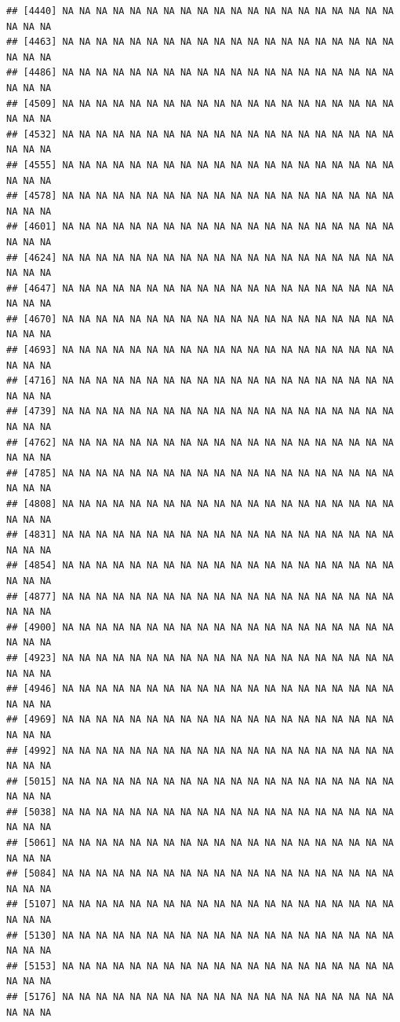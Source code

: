 \documentclass{article}\usepackage[]{graphicx}\usepackage[]{color}
\makeatletter
\newenvironment{kframe}{%
 \def\at@end@of@kframe{}%
 \ifinner\ifhmode%
  \def\at@end@of@kframe{\end{minipage}}%
  \begin{minipage}{\columnwidth}%
 \fi\fi%
 \def\FrameCommand##1{\hskip\@totalleftmargin \hskip-\fboxsep
 \colorbox{shadecolor}{##1}\hskip-\fboxsep
     \hskip-\linewidth \hskip-\@totalleftmargin \hskip\columnwidth}%
 \MakeFramed {\advance\hsize-\width
   \@totalleftmargin\z@ \linewidth\hsize
   \@setminipage}}%
 {\par\unskip\endMakeFramed%
 \at@end@of@kframe}
\newenvironment{knitrout}{}{} %
\makeatother
\begin{document}
\begin{knitrout}
\begin{kframe}
\begin{verbatim}
## [4440] NA NA NA NA NA NA NA NA NA NA NA NA NA NA NA NA NA NA NA NA NA NA NA
## [4463] NA NA NA NA NA NA NA NA NA NA NA NA NA NA NA NA NA NA NA NA NA NA NA
## [4486] NA NA NA NA NA NA NA NA NA NA NA NA NA NA NA NA NA NA NA NA NA NA NA
## [4509] NA NA NA NA NA NA NA NA NA NA NA NA NA NA NA NA NA NA NA NA NA NA NA
## [4532] NA NA NA NA NA NA NA NA NA NA NA NA NA NA NA NA NA NA NA NA NA NA NA
## [4555] NA NA NA NA NA NA NA NA NA NA NA NA NA NA NA NA NA NA NA NA NA NA NA
## [4578] NA NA NA NA NA NA NA NA NA NA NA NA NA NA NA NA NA NA NA NA NA NA NA
## [4601] NA NA NA NA NA NA NA NA NA NA NA NA NA NA NA NA NA NA NA NA NA NA NA
## [4624] NA NA NA NA NA NA NA NA NA NA NA NA NA NA NA NA NA NA NA NA NA NA NA
## [4647] NA NA NA NA NA NA NA NA NA NA NA NA NA NA NA NA NA NA NA NA NA NA NA
## [4670] NA NA NA NA NA NA NA NA NA NA NA NA NA NA NA NA NA NA NA NA NA NA NA
## [4693] NA NA NA NA NA NA NA NA NA NA NA NA NA NA NA NA NA NA NA NA NA NA NA
## [4716] NA NA NA NA NA NA NA NA NA NA NA NA NA NA NA NA NA NA NA NA NA NA NA
## [4739] NA NA NA NA NA NA NA NA NA NA NA NA NA NA NA NA NA NA NA NA NA NA NA
## [4762] NA NA NA NA NA NA NA NA NA NA NA NA NA NA NA NA NA NA NA NA NA NA NA
## [4785] NA NA NA NA NA NA NA NA NA NA NA NA NA NA NA NA NA NA NA NA NA NA NA
## [4808] NA NA NA NA NA NA NA NA NA NA NA NA NA NA NA NA NA NA NA NA NA NA NA
## [4831] NA NA NA NA NA NA NA NA NA NA NA NA NA NA NA NA NA NA NA NA NA NA NA
## [4854] NA NA NA NA NA NA NA NA NA NA NA NA NA NA NA NA NA NA NA NA NA NA NA
## [4877] NA NA NA NA NA NA NA NA NA NA NA NA NA NA NA NA NA NA NA NA NA NA NA
## [4900] NA NA NA NA NA NA NA NA NA NA NA NA NA NA NA NA NA NA NA NA NA NA NA
## [4923] NA NA NA NA NA NA NA NA NA NA NA NA NA NA NA NA NA NA NA NA NA NA NA
## [4946] NA NA NA NA NA NA NA NA NA NA NA NA NA NA NA NA NA NA NA NA NA NA NA
## [4969] NA NA NA NA NA NA NA NA NA NA NA NA NA NA NA NA NA NA NA NA NA NA NA
## [4992] NA NA NA NA NA NA NA NA NA NA NA NA NA NA NA NA NA NA NA NA NA NA NA
## [5015] NA NA NA NA NA NA NA NA NA NA NA NA NA NA NA NA NA NA NA NA NA NA NA
## [5038] NA NA NA NA NA NA NA NA NA NA NA NA NA NA NA NA NA NA NA NA NA NA NA
## [5061] NA NA NA NA NA NA NA NA NA NA NA NA NA NA NA NA NA NA NA NA NA NA NA
## [5084] NA NA NA NA NA NA NA NA NA NA NA NA NA NA NA NA NA NA NA NA NA NA NA
## [5107] NA NA NA NA NA NA NA NA NA NA NA NA NA NA NA NA NA NA NA NA NA NA NA
## [5130] NA NA NA NA NA NA NA NA NA NA NA NA NA NA NA NA NA NA NA NA NA NA NA
## [5153] NA NA NA NA NA NA NA NA NA NA NA NA NA NA NA NA NA NA NA NA NA NA NA
## [5176] NA NA NA NA NA NA NA NA NA NA NA NA NA NA NA NA NA NA NA NA NA NA NA

\end{verbatim}
\end{kframe}
\end{knitrout}
\end{document}
